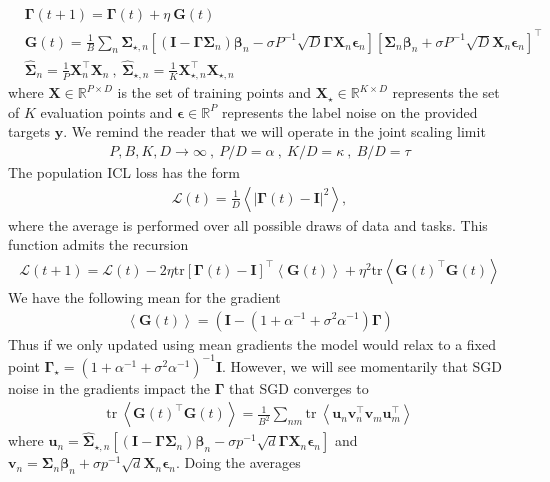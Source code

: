 \documentclass{article} %
\begin{document}
\begin{align}
    &\bm\Gamma(t+1) = \bm\Gamma(t) + \eta \ \bm G(t) \nonumber
    \\    
    &\bm G(t) = \frac{1}{B} \sum_{n} \hat{\bm\Sigma}_{\star , n} \left[ (\bm I - \bm\Gamma \bm\Sigma_n ) \bm\beta_n - \sigma P^{-1} \sqrt{D}\bm\Gamma \bm X_n \bm\epsilon_n \right]  \left[ \bm\Sigma_n \bm\beta_n + \sigma P^{-1} \sqrt{D} \bm X_n \bm\epsilon_n \right]^\top \nonumber
    \\ 
    &\hat{\bm\Sigma}_n = \frac{1}{P} \bm X_n^\top \bm X_n \ , \ \hat{\bm\Sigma}_{\star,n} = \frac{1}{K} \bm X_{\star,n}^\top \bm X_{\star,n} 
\end{align}
where $\bm X \in \mathbb{R}^{P \times D}$ is the set of training points and $\bm X_{\star} \in \mathbb{R}^{K \times D}$ represents the set of $K$ evaluation points and $\bm\epsilon \in \mathbb{R}^P$ represents the label noise on the provided targets $\bm y$. We remind the reader that we will operate in the joint scaling limit
\begin{align}
    P,B,K, D \to \infty \ , \ P / D = \alpha \ , \ K/D = \kappa \ , \ B / D = \tau
\end{align}
The population ICL loss has the form
\begin{align}
    \mathcal L(t) = \frac{1}{D} \left< |\bm\Gamma(t) - \bm I|^2 \right> ,
\end{align}
where the average is performed over all possible draws of data and tasks. This function admits the recursion
\begin{align}
    \mathcal L(t+1) = \mathcal L(t) - 2 \eta \text{tr}[\bm \Gamma(t) - \bm I]^\top  \left< \bm G(t) \right> + \eta^2 \text{tr} \left< \bm G(t)^\top \bm G(t) \right>
\end{align}
We have the following mean for the gradient
\begin{align}
    \left< \bm G(t) \right> = (\bm I - (1+\alpha^{-1} + \sigma^2 \alpha^{-1}) \bm\Gamma ) 
\end{align}
Thus if we only updated using mean gradients the model would relax to a fixed point $\bm\Gamma_\star = \left( 1 + \alpha^{-1} + \sigma^2 \alpha^{-1} \right)^{-1} \bm I$. However, we will see momentarily that SGD noise in the gradients impact the $\bm \Gamma$ that SGD converges to
\begin{align}
 \text{tr} \ \left<  \bm G(t)^\top \bm G(t) \right >  =  \frac{1}{B^2} \sum_{nm} \text{tr} \  \left< \bm u_n \bm v_n^\top \bm v_m \bm u_m^\top \right> 
\end{align}
where $\bm u_n = \bm{\hat\Sigma}_{\star,n} \left[ (\bm I - \bm\Gamma \bm\Sigma_n ) \bm\beta_n - \sigma p^{-1} \sqrt{d}\bm\Gamma \bm X_n \bm\epsilon_n \right]$ and $\bm v_n = \bm\Sigma_n \bm\beta_n + \sigma p^{-1} \sqrt{d} \bm X_n \bm\epsilon_n$. Doing the averages
\end{document}
